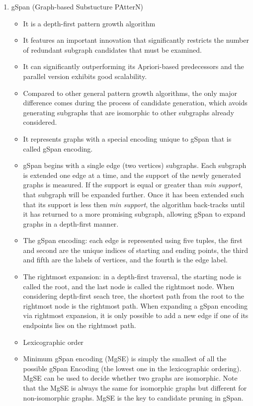 \documentclass[14pt]{article}
\begin{document}
\begin{enumerate}
\item gSpan (Graph-based Substucture PAtterN)
 \begin{itemize}
  \item It is a depth-first pattern growth algorithm
  \item It features an important innovation that significantly restricts the number of redundant subgraph candidates that must be examined.
  \item It can significantly outperforming its Apriori-based predecessors and the parallel version exhibits good scalability.
  \item Compared to other general pattern growth algorithms, the only major difference comes during the process of candidate generation, which avoids generating subgraphs that are isomorphic to other subgraphs already considered.
  \item It represents graphs with a special encoding unique to gSpan that is called gSpan encoding. 
  \item gSpan begins with a single edge (two vertices) subgraphs. Each subgraph is extended one edge at a time, and the support of the newly generated graphs is measured. If the support is equal or greater than \emph{min support}, that subgraph will be expanded further. Once it has been extended such that its support is less then \emph{min support}, the algorithm back-tracks until it has returned to a more promising subgraph, allowing gSpan to expand graphs in a depth-first manner.
  \item The gSpan encoding: each edge is represented using five tuples, the first and second are the unique indices of starting and ending points, the third and fifth are the labels of vertices, and the fourth is the edge label.
  \item The rightmost expansion: in a depth-first traversal, the starting node is called the root, and the last node is called the rightmost node. When considering depth-first seach tree, the shortest path from the root to the rightmost node is the rightmost path. When expanding a gSpan encoding via rightmost expansion, it is only possible to add a new edge if one of its endpoints lies on the rightmost path.
  \item Lexicographic order
  \item Minimum gSpan encoding (MgSE) is simply the smallest of all the possible gSpan Encoding (the lowest one in the lexicographic ordering). MgSE can be used to decide whether two graphs are isomorphic. Note that the MgSE is always the same for isomorphic graphs but different for non-isomorphic graphs. MgSE is the key to candidate pruning in gSpan.
 \end{itemize}
 

\end{enumerate}
\end{document}
